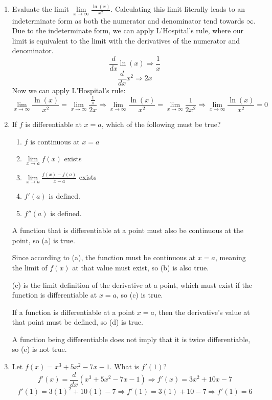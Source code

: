 \documentclass{article}
\begin{document}
\begin{enumerate}
\item Evaluate the limit $\underset{x \rightarrow \infty}{\lim}\frac{\ln(x)}{x^{2}}$.
Calculating this limit literally leads to an indeterminate form as both the numerator and denominator
tend towards $\infty$. Due to the indeterminate form, we can apply L'Hospital's rule, where our limit
is equivalent to the limit with the derivatives of the numerator and denominator.
\[\frac{d}{dx}\ln(x) \Longrightarrow \frac{1}{x}\]
\[\frac{d}{dx}x^{2} \Longrightarrow 2x\]
Now we can apply L'Hospital's rule:
\[\underset{x \rightarrow \infty}{\lim}\frac{\ln(x)}{x^{2}} =
    \underset{x \rightarrow \infty}{\lim}\frac{\frac{1}{\times}}{2x}
    \Longrightarrow \underset{x \rightarrow \infty}{\lim}\frac{\ln(x)}{x^{2}} =
    \underset{x \rightarrow \infty}{\lim}\frac{1}{2x^{2}}
    \Longrightarrow \underset{x \rightarrow \infty}{\lim}\frac{\ln(x)}{x^{2}} = 0\]

\item If $f$ is differentiable at $x = a$, which of the following must be true?
    \begin{enumerate}
        \item $f$ is continuous at $x = a$
        \item $\underset{x \rightarrow a}{\lim} f(x)$ exists
        \item $\underset{x \rightarrow a}{\lim}\frac{f(x) - f(a)}{x - a}$ exists
        \item $f'(a)$ is defined.
        \item $f''(a)$ is defined.
    \end{enumerate}

A function that is differentiable at a point must also be continuous at the point, so (a) is true.

Since according to (a), the function must be continuous at $x = a$, meaning the limit of $f(x)$ at
that value must exist, so (b) is also true.

(c) is the limit definition of the derivative at a point, which must exist if the function is
differentiable at $x = a$, so (c) is true.

If a function is differentiable at a point $x = a$, then the derivative's value at that point must
be defined, so (d) is true.

A function being differentiable does not imply that it is twice differentiable, so (e) is not true.

\item Let $f(x) = x^{3} + 5x^{2} - 7x - 1$. What is $f'(1)$?
\[f'(x) = \frac{d}{dx}\left(x^{3} + 5x^{2} - 7x - 1\right) \Longrightarrow f'(x) = 3x^{2} + 10x - 7\]
\[f'(1) = 3{(1)}^{2} + 10(1) - 7 \Longrightarrow f'(1) = 3(1) + 10 - 7 \Longrightarrow f'(1) = 6\]


\end{enumerate}
\end{document}
